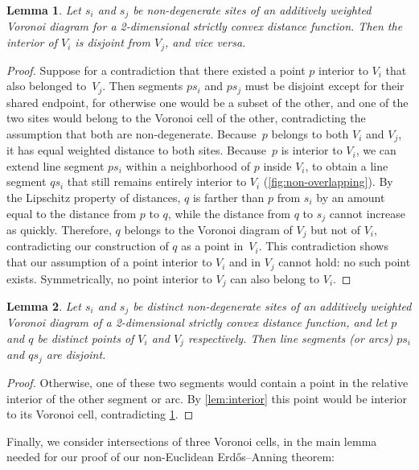 \documentclass[11pt]{article}
\newtheorem{lemma}{Lemma}
\theoremstyle{definition}
\begin{document}
\begin{lemma}
\label{lem:non-overlapping}
Let $s_i$ and $s_j$ be non-degenerate sites of an additively weighted Voronoi diagram for a 2-dimensional strictly convex distance function. Then the interior of $V_i$ is disjoint from $V_j$, and vice versa.
\end{lemma}

\begin{proof}
Suppose for a contradiction that there existed a point $p$ interior to $V_i$ that also belonged to~$V_j$.
Then segments $ps_i$ and $ps_j$ must be disjoint except for their shared endpoint, for otherwise one would be a subset of the other, and one of the two sites would belong to the Voronoi cell of the other, contradicting the assumption that both are non-degenerate. Because~$p$ belongs to both $V_i$ and $V_j$, it has equal weighted distance to both sites.
Because~$p$ is interior to $V_i$, we can extend line segment $ps_i$ within a neighborhood of $p$ inside $V_i$, to obtain
a line segment $qs_i$ that still remains entirely interior to $V_i$ (\cref{fig:non-overlapping}). By the Lipschitz property of distances, $q$ is farther than $p$ from $s_i$ by an amount equal to the distance from $p$ to $q$, while the distance from $q$ to $s_j$ cannot increase as quickly.
Therefore, $q$ belongs to the Voronoi diagram of $V_j$ but not of $V_i$, contradicting our construction of $q$ as a point in~$V_i$. This contradiction shows that our assumption of a point interior to $V_i$ and in $V_j$ cannot hold: no such point exists. Symmetrically, no point interior to $V_j$ can also belong to $V_i$.
\end{proof}

\begin{lemma}
\label{lem:cross}
Let $s_i$ and $s_j$ be distinct non-degenerate sites of an additively weighted Voronoi diagram of a 2-dimensional strictly convex distance function, and let $p$ and $q$ be distinct points of $V_i$ and $V_j$ respectively. Then line segments (or arcs)  $ps_i$ and $qs_j$ are disjoint.
\end{lemma}

\begin{proof}
Otherwise, one of these two segments would contain a point in the relative interior of the other segment or arc. By \cref{lem:interior} this point would be interior to its Voronoi cell, contradicting \cref{lem:non-overlapping}.
\end{proof}

Finally, we consider intersections of three Voronoi cells, in the main lemma needed for our proof of our non-Euclidean Erd\H{o}s--Anning theorem:
\end{document}
